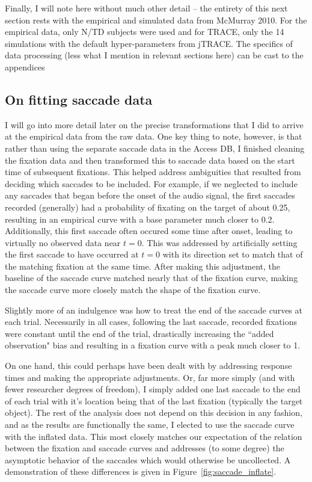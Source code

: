 \documentclass{article}
\begin{document}
Finally, I will note here without much other detail -- the entirety of this next section rests with the empirical and simulated data from McMurray 2010. For the empirical data, only N/TD subjects were used and for TRACE, only the 14 simulations with the default hyper-parameters from jTRACE. The specifics of data processing (less what I mention in relevant sections here) can be cast to the appendices

\subsection{On fitting saccade data}


I will go into more detail later on the precise transformations that I did to arrive at the empirical data from the raw data.  One key thing to note, however, is that rather than using the separate saccade data in the Access DB, I finished cleaning the fixation data and then transformed this to saccade data based on the start time of subsequent fixations. This helped address ambiguities that resulted from deciding which saccades to be included. For example, if we neglected to include any saccades that began before the onset of the audio signal, the first saccades recorded (generally) had a probability of fixating on the target of about 0.25, resulting in an empirical curve with a base parameter much closer to 0.2. Additionally, this first saccade often occured some time after onset, leading to virtually no observed data near $t = 0$. This was addressed by artificially setting the first saccade to have occurred at $t = 0$ with its direction set to match that of the matching fixation at the same time. After making this adjustment, the baseline of the saccade curve matched nearly that of the fixation curve, making the saccade curve more closely match the shape of the fixation curve.

Slightly more of an indulgence was how to treat the end of the saccade curves at each trial. Necessarily in all cases, following the last saccade, recorded fixations were constant until the end of the trial, drastically increasing the ``added observation" bias and resulting in a fixation curve with a peak much closer to 1.

On one hand, this could perhaps have been dealt with by addressing response times and making the appropriate adjustments. Or, far more simply (and with fewer researcher degrees of freedom), I simply added one last saccade to the end of each trial with it's location being that of the last fixation (typically the target object). The rest of the analysis does not depend on this decision in any fashion, and as the results are functionally the same, I elected to use the saccade curve with the inflated data. This most closely matches our expectation of the relation between the fixation and saccade curves and addresses (to some degree) the asymptotic behavior of the saccades which would otherwise be uncollected. A demonstration of these differences is given in Figure~\ref{fig:saccade_inflate}.
\end{document}
